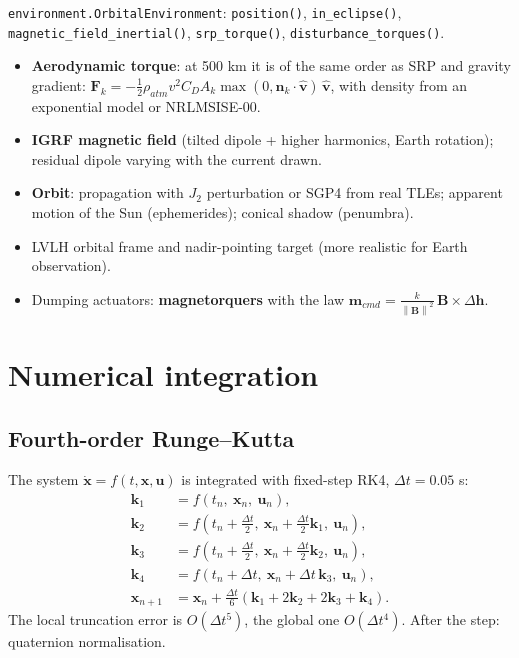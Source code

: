\documentclass[11pt,a4paper]{article}
\newcommand{\vect}[1]{\bm{#1}}
\newcommand{\norm}[1]{\left\lVert #1 \right\rVert}
\newcommand{\code}[1]{\texttt{#1}}
\begin{document}
\begin{incode}
\code{environment.OrbitalEnvironment}: \code{position()}, \code{in\_eclipse()},
\code{magnetic\_field\_inertial()}, \code{srp\_torque()},
\code{disturbance\_torques()}.
\end{incode}

\begin{improvement}
\begin{itemize}[nosep]
  \item \textbf{Aerodynamic torque}: at 500 km it is of the same order as SRP and
        gravity gradient: $\vect F_k = -\tfrac12\rho_{atm} v^2 C_D A_k \max(0,\hat{\vect n}_k\cdot\hat{\vect v})\,\hat{\vect v}$,
        with density from an exponential model or NRLMSISE-00.
  \item \textbf{IGRF magnetic field} (tilted dipole + higher harmonics,
        Earth rotation); residual dipole varying with the current drawn.
  \item \textbf{Orbit}: propagation with $J_2$ perturbation or SGP4 from real
        TLEs; apparent motion of the Sun (ephemerides); conical shadow
        (penumbra).
  \item LVLH orbital frame and nadir-pointing target (more realistic
        for Earth observation).
  \item Dumping actuators: \textbf{magnetorquers} with the law
        $\vect m_{cmd} = \frac{k}{\norm{\vect B}^2}\,\vect B\times\Delta\vect h$.
\end{itemize}
\end{improvement}

\section{Numerical integration}\label{sec:rk4}

\subsection{Fourth-order Runge--Kutta}
The system $\dot{\vect x} = f(t,\vect x,\vect u)$ is integrated with fixed-step
RK4, $\Delta t = 0.05$ s:
\begin{align}
  \vect k_1 &= f(t_n,\ \vect x_n,\ \vect u_n),\\
  \vect k_2 &= f(t_n+\tfrac{\Delta t}{2},\ \vect x_n+\tfrac{\Delta t}{2}\vect k_1,\ \vect u_n),\\
  \vect k_3 &= f(t_n+\tfrac{\Delta t}{2},\ \vect x_n+\tfrac{\Delta t}{2}\vect k_2,\ \vect u_n),\\
  \vect k_4 &= f(t_n+\Delta t,\ \vect x_n+\Delta t\,\vect k_3,\ \vect u_n),\\
  \vect x_{n+1} &= \vect x_n + \frac{\Delta t}{6}\left(\vect k_1+2\vect k_2+2\vect k_3+\vect k_4\right).
\end{align}
The local truncation error is $O(\Delta t^5)$, the global one $O(\Delta t^4)$.
After the step: quaternion normalisation.
\end{document}
